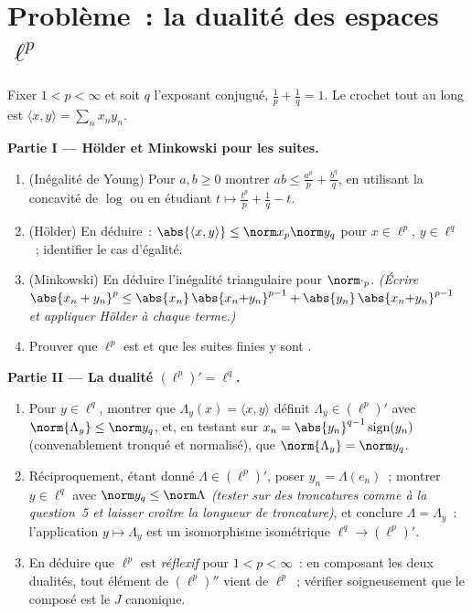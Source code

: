 \section{Problème~: la dualité des espaces
\texorpdfstring{$\ell^p$}{lp}}

\begin{problem}[{Problème de fin de semaine --- $(\ell^p)' =
\ell^q$, réflexivité, et l'étrangeté de $\ell^\infty$}]
\label{pb:b3:banach:1}
Fixer $1 < p < \infty$ et soit $q$ l'exposant conjugué,
$\frac1p + \frac1q = 1$. Le crochet tout au long est $\langle
x, y\rangle = \sum_n x_ny_n$.

\medskip
\noindent\textbf{Partie I --- Hölder et Minkowski pour les
suites.}
\begin{enumerate}
  \item (Inégalité de Young) Pour $a, b \geq 0$ montrer $ab
        \leq \frac{a^p}p + \frac{b^q}q$, en utilisant la
        concavité de $\log$ ou en étudiant $t \mapsto
        \frac{t^p}p + \frac1q - t$.
  \item (Hölder) En déduire~: $\abs{\langle x, y\rangle} \leq
        \norm x_p\norm y_q$ pour $x \in \ell^p$, $y \in
        \ell^q$~; identifier le cas d'égalité.
  \item (Minkowski) En déduire l'inégalité triangulaire pour
        $\norm\cdot_p$. \emph{(Écrire $\abs{x_n + y_n}^p \leq
        \abs{x_n}\,\abs{x_n{+}y_n}^{p-1} +
        \abs{y_n}\,\abs{x_n{+}y_n}^{p-1}$ et appliquer Hölder
        à chaque terme.)}
  \item Prouver que $\ell^p$ est  et que les suites
        finies y sont .
\end{enumerate}

\medskip
\noindent\textbf{Partie II --- La dualité $(\ell^p)' =
\ell^q$.}
\begin{enumerate}[resume]
  \item Pour $y \in \ell^q$, montrer que $\Lambda_y(x) =
        \langle x, y\rangle$ définit $\Lambda_y \in (\ell^p)'$
        avec $\norm{\Lambda_y} \leq \norm y_q$, et, en testant
        sur $x_n = \abs{y_n}^{q-1}\operatorname{sign}(y_n)$
        (convenablement tronqué et normalisé), que
        $\norm{\Lambda_y} = \norm y_q$.
  \item Réciproquement, étant donné $\Lambda \in (\ell^p)'$,
        poser $y_n = \Lambda(e_n)$~; montrer $y \in \ell^q$
        avec $\norm y_q \leq \norm\Lambda$ \emph{(tester sur
        des troncatures comme à la question~5 et laisser
        croître la longueur de troncature)}, et conclure
        $\Lambda = \Lambda_y$~: l'application $y \mapsto
        \Lambda_y$ est un isomorphisme isométrique $\ell^q
        \to (\ell^p)'$.
  \item En déduire que $\ell^p$ est \emph{réflexif} pour $1 <
        p < \infty$~: en composant les deux dualités, tout
        élément de $(\ell^p)''$ vient de $\ell^p$~; vérifier
        soigneusement que le composé est le $J$ canonique.
\end{enumerate}


\end{problem}
